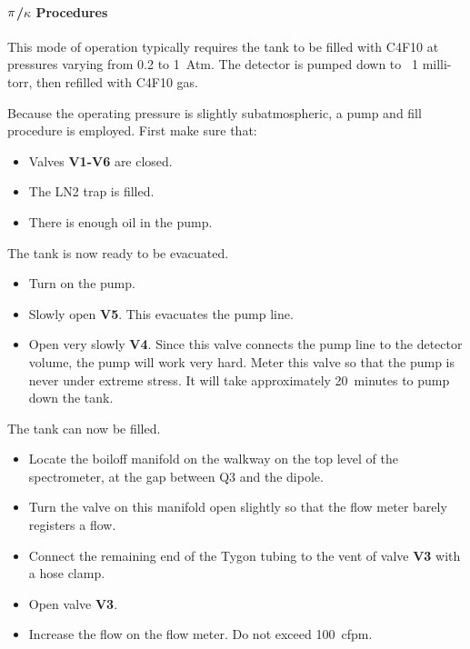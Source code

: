 {{%

\paragraph{$\bf{\pi}$/$\kappa$ Procedures}
This mode of operation typically requires the tank to be filled with
C4F10 at pressures varying from 0.2 to 1~Atm. The detector is pumped
down to ~1 milli-torr, then refilled with C4F10 gas.

Because the operating pressure is slightly subatmospheric, a pump and fill
procedure is employed.  First make sure that:
\begin{itemize}
\item Valves {\bf V1-V6} are closed.
\item The LN2 trap is filled.
\item There is enough oil in the pump.
\end{itemize}
The tank is now ready to be evacuated.
\begin{itemize}
\item Turn on the pump.
\item Slowly open {\bf V5}.  This evacuates the pump line.
\item Open very slowly {\bf V4}.  Since this valve connects the pump line to
the detector volume, the pump will work very hard.  Meter this valve
so that the pump is never under extreme stress.  It will take approximately
20~minutes to pump down the tank.
\end{itemize}
The tank can now be filled.
\begin{itemize}
\item Locate the boiloff manifold on the walkway on the top level of the
spectrometer, at the gap between Q3 and the dipole.
\item Turn the valve on this manifold open slightly so that the flow meter
barely registers a flow.
\item Connect the remaining end of the Tygon tubing to the vent of valve
{\bf V3} with a hose clamp.
\item Open valve {\bf V3}.
\item Increase the flow on the flow meter.  Do not exceed 100~cfpm.

\end{itemize}}}
